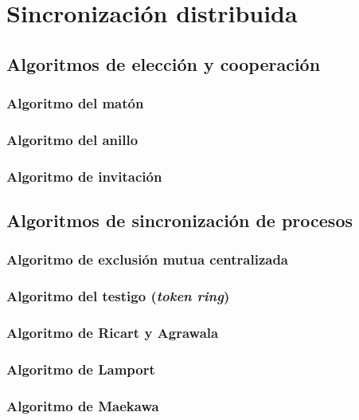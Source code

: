 \documentclass[a4paper, 11pt, titlepage]{article}
\begin{document}
\section{Sincronización distribuida}

    \subsection{Algoritmos de elección y cooperación}

        \subsubsection{Algoritmo del matón}

        \subsubsection{Algoritmo del anillo}

        \subsubsection{Algoritmo de invitación}

    \subsection{Algoritmos de sincronización de procesos}

        \subsubsection{Algoritmo de exclusión mutua centralizada}

        \subsubsection{Algoritmo del testigo (\textit{token ring})}

        \subsubsection{Algoritmo de Ricart y Agrawala}

        \subsubsection{Algoritmo de Lamport}

        \subsubsection{Algoritmo de Maekawa}
\end{document}

